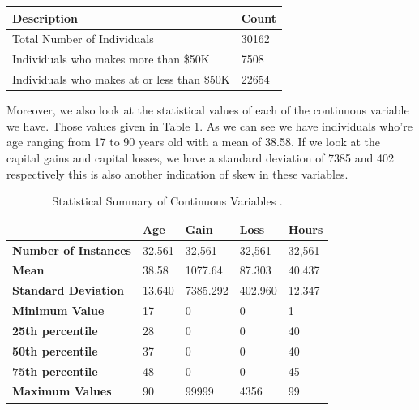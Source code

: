\documentclass[sigconf]{acmart}
\begin{document}
\begin{center}
\centering
\begin{tabular}{ll}
\hline
\multicolumn{1}{|l|}{\textbf{Description}} & \multicolumn{1}{l|}{\textbf{Count}} \\ \hline
Total Number of Individuals                & 30162                               \\ \hline
Individuals who makes more than \$50K        & 7508                                \\ \hline
Individuals who makes at or less than \$50K  & 22654                              \\ \hline
\end{tabular}
\label{my-label-2}
\end{center}

\par Moreover, we also look at the statistical values of each of the continuous variable we have. Those values given in Table \ref{my-label}. As we can see we have individuals who're age ranging from 17 to 90 years old with a mean of 38.58. If we look at the capital gains and capital losses, we have a standard deviation of 7385 and 402 respectively this is also another indication of skew in these variables. 

\begin{table}[!ht]
\centering
\begin{tabular}{|l|l|l|l|l|}
\hline
                    & \textbf{Age} & \textbf{Gain} & \textbf{Loss} & \textbf{Hours} \\ \hline
\textbf{Number of Instances} & 32,561 & 32,561       & 32,561       & 32,561         \\ \hline
\textbf{Mean}                & 38.58  & 1077.64      & 87.303       & 40.437         \\ \hline
\textbf{Standard Deviation}  & 13.640 & 7385.292     & 402.960      & 12.347         \\ \hline
\textbf{Minimum Value}       & 17     & 0            & 0            & 1              \\ \hline
\textbf{25th percentile}     & 28     & 0            & 0            & 40             \\ \hline
\textbf{50th percentile}     & 37     & 0            & 0            & 40             \\ \hline
\textbf{75th percentile}     & 48     & 0            & 0            & 45             \\ \hline
\textbf{Maximum Values}      & 90     & 99999        & 4356         & 99             \\ \hline
\end{tabular}
\caption{Statistical Summary of Continuous Variables \cite{Borga2017}.}
\label{my-label}
\end{table}
\end{document}

